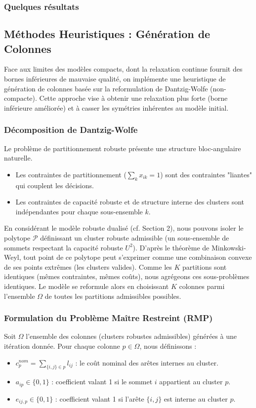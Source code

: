 \documentclass{article}
\begin{document}
\subsubsection*{Quelques résultats}

\subsection{Méthodes Heuristiques : Génération de Colonnes}
Face aux limites des modèles compacts, dont la relaxation continue fournit des bornes inférieures de mauvaise qualité, on implémente une heuristique de génération de colonnes basée sur la reformulation de Dantzig-Wolfe (non-compacte). Cette approche vise à obtenir une relaxation plus forte (borne inférieure améliorée) et à casser les symétries inhérentes au modèle initial.
\subsubsection*{Décomposition de Dantzig-Wolfe}

Le problème de partitionnement robuste présente une structure bloc-angulaire naturelle.
\begin{itemize}
    \item Les contraintes de partitionnement ($\sum_k x_{ik} = 1$) sont des contraintes "liantes" qui couplent les décisions.
    \item Les contraintes de capacité robuste et de structure interne des clusters sont indépendantes pour chaque sous-ensemble $k$.
\end{itemize}

En considérant le modèle robuste dualisé (cf. Section 2), nous pouvons isoler le polytope $\mathcal{P}$ définissant un cluster robuste admissible (un sous-ensemble de sommets respectant la capacité robuste $U^2$). D'après le théorème de Minkowski-Weyl, tout point de ce polytope peut s'exprimer comme une combinaison convexe de ses points extrêmes (les clusters valides).
Comme les $K$ partitions sont identiques (mêmes contraintes, mêmes coûts), nous agrégeons ces sous-problèmes identiques.
Le modèle se reformule alors en choisissant $K$ colonnes parmi l'ensemble $\Omega$ de toutes les partitions admissibles possibles.

\subsubsection*{Formulation du Problème Maître Restreint (RMP)}

Soit $\Omega$ l'ensemble des colonnes (clusters robustes admissibles) générées à une itération donnée.
Pour chaque colonne $p \in \Omega$, nous définissons :
\begin{itemize}
    \item $c_p^{nom} = \sum_{\{i,j\} \in p} l_{ij}$ : le coût nominal des arêtes internes au cluster.
    \item $a_{ip} \in \{0,1\}$ : coefficient valant 1 si le sommet $i$ appartient au cluster $p$.
    \item $e_{ij,p} \in \{0,1\}$ : coefficient valant 1 si l'arête $\{i,j\}$ est interne au cluster $p$.
\end{itemize}
\end{document}
